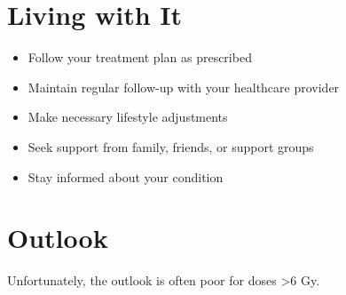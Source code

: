 \section{Living with It}
\begin{itemize}[noitemsep]
  \item Follow your treatment plan as prescribed
  \item Maintain regular follow-up with your healthcare provider
  \item Make necessary lifestyle adjustments
  \item Seek support from family, friends, or support groups
  \item Stay informed about your condition
\end{itemize}
\section{Outlook}
Unfortunately, the outlook is often poor for doses >6 Gy.
